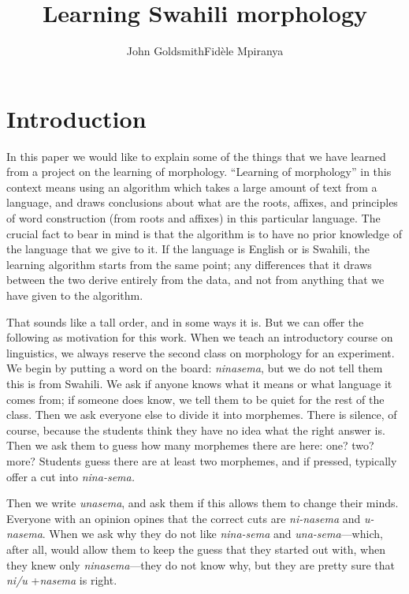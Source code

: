 \documentclass[output=paper,colorlinks,citecolor=brown,
]{langscibook}
\author{John Goldsmith\affiliation{University of Chicago}\lastand Fidèle Mpiranya\affiliation{University of Chicago}}
\title{Learning Swahili morphology}
\begin{document}
\maketitle

\section{Introduction}
In this paper we would like to explain some of the things that we have learned from a project on the learning of morphology. ``Learning of morphology'' in this context means using an algorithm which takes a large amount of text from a language, and draws conclusions about what are the roots, affixes, and principles of word construction (from roots and affixes) in this particular language. The crucial fact to bear in mind is that the algorithm is to have no prior knowledge of the language that we give to it. If the language is English or is Swahili, the learning algorithm starts from the same point; any differences that it draws between the two derive entirely from the data, and not from anything that we have given to the algorithm. 

That sounds like a tall order, and in some ways it is. But we can offer the following as motivation for this work. When we teach an introductory course on linguistics, we always reserve the second class on morphology for an experiment. We begin by putting a word on the board: \textit{ninasema}, but we do not tell them this is from Swahili. We ask if anyone knows what it means or what language it comes from; if someone does know, we tell them to be quiet for the rest of the class. Then we ask everyone else to divide it into morphemes. There is silence, of course, because the students think they have no idea what the right answer is. Then we ask them to guess how many morphemes there are here: one? two? more? Students guess there are at least two morphemes, and if pressed, typically offer a cut into \textit{nina-sema.}

Then we write \textit{unasema}, and ask them if this allows them to change their minds. Everyone with an opinion opines that the correct cuts are \textit{ni-nasema} and \textit{u-nasema}. When we ask why they do not like \textit{nina-sema} and \textit{una-sema}---which, after all, would allow them to keep the guess that they started out with, when they knew only \textit{ninasema}---they do not know why, but they are pretty sure that \textit{ni/u} +\textit{nasema} is right.
\end{document}
